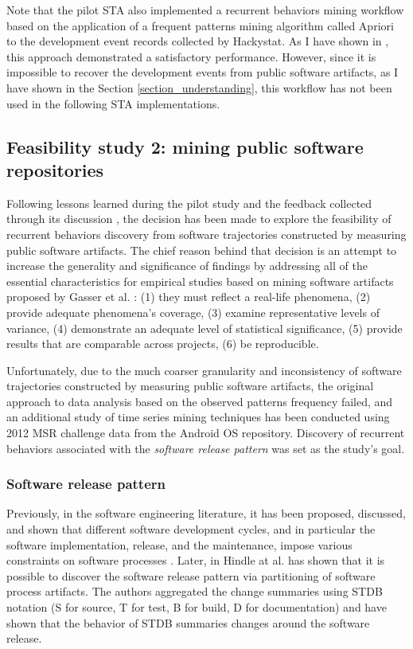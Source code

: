 Note that the pilot STA also implemented a recurrent behaviors mining workflow based on the application of a frequent patterns mining algorithm called Apriori \cite{citeulike:775528} to the development event records collected by Hackystat. As I have shown in \cite{citeulike:13159603}, this approach demonstrated a satisfactory performance. However, since it is impossible to recover the development events from public software artifacts, as I have shown in the Section \ref{section_understanding}, this workflow has not been used in the following STA implementations.

\subsection{Feasibility study 2: mining public software repositories} \label{feasibility2}
Following lessons learned during the pilot study and the feedback collected through its discussion \cite{csdl2-10-09}, 
the decision has been made to explore the feasibility of recurrent behaviors discovery from software trajectories constructed 
by measuring public software artifacts. The chief reason behind that decision is an attempt to increase 
the generality and significance of findings  by addressing all of the essential characteristics for empirical studies based on mining 
software artifacts proposed by Gasser et al. \cite{citeulike:13058334}:  
(1) they must reflect a real-life phenomena, 
(2) provide adequate phenomena's coverage, 
(3) examine representative levels of variance, 
(4) demonstrate an adequate level of statistical significance,
(5) provide results that are comparable across projects,
(6) be reproducible. 

Unfortunately, due to the much coarser granularity and inconsistency of software trajectories constructed by measuring public software artifacts, the original approach to data analysis based on the observed patterns frequency failed, and an additional study of time series mining techniques has been conducted using 2012 MSR challenge data \cite{MSRChallenge2012} from the Android OS repository. Discovery of recurrent behaviors associated with the \textit{software release pattern } was set as the study's goal.

\subsubsection{Software release pattern}
Previously, in the software engineering literature, it has been proposed, discussed, and shown that different software 
development cycles, and in particular the software implementation, release, and the maintenance, impose various constraints 
on software processes \cite{citeulike:1802027} \cite{citeulike:13374124} \cite{citeulike:13374128} \cite{citeulike:6086365}.
Later, in \cite{citeulike:10377366} Hindle at al. has shown that it is possible to discover the software release pattern
via partitioning of software process artifacts. The authors aggregated the change summaries using STDB notation 
(S for source, T for test, B for build, D for documentation) and have shown that the behavior of STDB summaries changes
around the software release.

